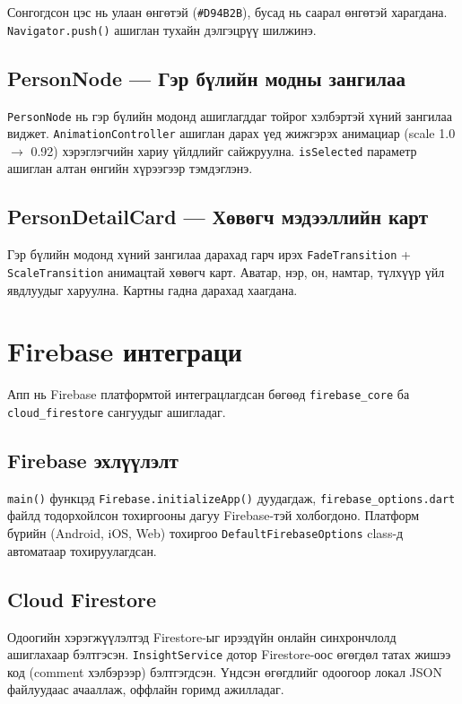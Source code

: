 Сонгогдсон цэс нь улаан өнгөтэй (\texttt{\#D94B2B}), бусад нь саарал өнгөтэй харагдана. \texttt{Navigator.push()} ашиглан тухайн дэлгэцрүү шилжинэ.

\subsection{PersonNode — Гэр бүлийн модны зангилаа}

\texttt{PersonNode} нь гэр бүлийн модонд ашиглагддаг тойрог хэлбэртэй хүний зангилаа виджет. \texttt{AnimationController} ашиглан дарах үед жижгэрэх анимациар (scale 1.0 $\rightarrow$ 0.92) хэрэглэгчийн хариу үйлдлийг сайжруулна. \texttt{isSelected} параметр ашиглан алтан өнгийн хүрээгээр тэмдэглэнэ.

\subsection{PersonDetailCard — Хөвөгч мэдээллийн карт}

Гэр бүлийн модонд хүний зангилаа дарахад гарч ирэх \texttt{FadeTransition} + \texttt{ScaleTransition} анимацтай хөвөгч карт. Аватар, нэр, он, намтар, түлхүүр үйл явдлуудыг харуулна. Картны гадна дарахад хаагдана.

\section{Firebase интеграци}

Апп нь Firebase платформтой интеграцлагдсан бөгөөд \texttt{firebase\_core} ба \texttt{cloud\_firestore} сангуудыг ашигладаг.

\subsection{Firebase эхлүүлэлт}

\texttt{main()} функцэд \texttt{Firebase.initializeApp()} дуудагдаж, \texttt{firebase\_options.dart} файлд тодорхойлсон тохиргооны дагуу Firebase-тэй холбогдоно. Платформ бүрийн (Android, iOS, Web) тохиргоо \texttt{DefaultFirebaseOptions} class-д автоматаар тохируулагдсан.

\subsection{Cloud Firestore}

Одоогийн хэрэгжүүлэлтэд Firestore-ыг ирээдүйн онлайн синхрончлолд ашиглахаар бэлтгэсэн. \texttt{InsightService} дотор Firestore-оос өгөгдөл татах жишээ код (comment хэлбэрээр) бэлтгэгдсэн. Үндсэн өгөгдлийг одоогоор локал JSON файлуудаас ачааллаж, оффлайн горимд ажилладаг.


